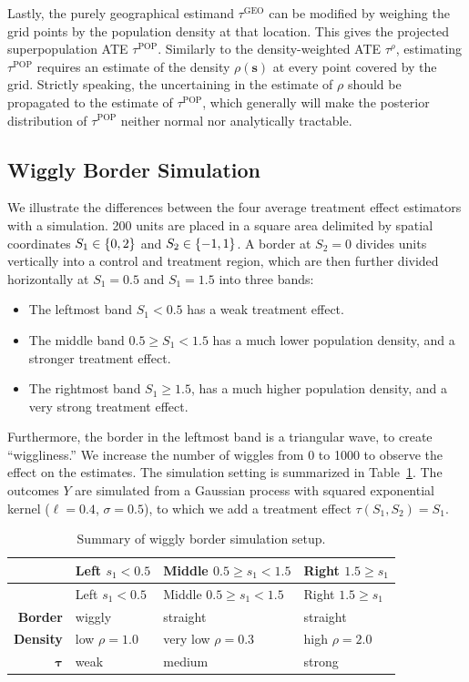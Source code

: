 \documentclass[letter]{article}
\providecommand{\tightlist}{%
      \setlength{\itemsep}{0pt}\setlength{\parskip}{0pt}}
\newcommand{\svec}{\mathbold{s}}
\newcommand{\taurho}{\tau^{\rho}}
\newcommand{\taugeo}{\tau^{\mathrm{GEO}}}
\newcommand{\taupop}{\tau^{\mathrm{POP}}}
\newcommand{\taubold}{\bm{\tau}}
\providecommand{\tightlist}{%
  	  \setlength{\itemsep}{0pt}\setlength{\parskip}{0pt}}
\begin{document}
Lastly, the purely geographical estimand \(\taugeo\) can be modified by weighing the grid points by the population density at that location.
This gives the projected superpopulation ATE \(\taupop\).
Similarly to the density-weighted ATE \(\taurho\), estimating \(\taupop\) requires an estimate of the density \(\rho(\svec)\) at every point covered by the grid.
Strictly speaking, the uncertaining in the estimate of \(\rho\) should be propagated to the estimate of \(\taupop\), which generally will make the posterior distribution of \(\taupop\) neither normal nor analytically tractable.
    


    	\subsection{Wiggly Border Simulation}\label{wiggly-border-simulation}

We illustrate the differences between the four average treatment effect estimators with a simulation.
200 units are placed in a square area delimited by spatial coordinates \(S_1 \in \cbr{0,2}\) and \(S_2 \in \cbr{-1, 1}\).
A border at \(S_2=0\) divides units vertically into a control and treatment region,
which are then further divided horizontally at \(S_1=0.5\) and \(S_1=1.5\) into three bands:

\begin{itemize}
\tightlist
\item
  The leftmost band \(S_1 < 0.5\) has a weak treatment effect.
\item
  The middle band \(0.5 \ge S_1 < 1.5\) has a much lower population density, and a stronger treatment effect.
\item
  The rightmost band \(S_1 \ge 1.5\), has a much higher population density, and a very strong treatment effect.
\end{itemize}

Furthermore, the border in the leftmost band is a triangular wave, to create ``wiggliness.''
We increase the number of wiggles from 0 to 1000 to observe the effect on the estimates.
The simulation setting is summarized in Table~\ref{table:wiggly_setup}.
The outcomes \(Y\) are simulated from a Gaussian process with squared exponential kernel
(\(\ell=0.4\), \(\sigma=0.5\)), to which we add a treatment effect \(\tau(S_1, S_2) = S_1\).
    


    	\begin{longtable}[]{@{}rlll@{}}
\caption{Summary of wiggly border simulation setup. \label{table:wiggly_setup}}\tabularnewline
\toprule
& Left \(s_1< 0.5\) & Middle \(0.5 \ge s_1 < 1.5\) & Right \(1.5 \ge s_1\)\tabularnewline
\midrule
\endfirsthead
\toprule
& Left \(s_1< 0.5\) & Middle \(0.5 \ge s_1 < 1.5\) & Right \(1.5 \ge s_1\)\tabularnewline
\midrule
\endhead
\textbf{Border} & wiggly & straight & straight\tabularnewline
\textbf{Density} & low \(\rho=1.0\) & very low \(\rho=0.3\) & high \(\rho=2.0\)\tabularnewline
\(\taubold\) & weak & medium & strong\tabularnewline
\bottomrule
\end{longtable}
    
\end{document}
